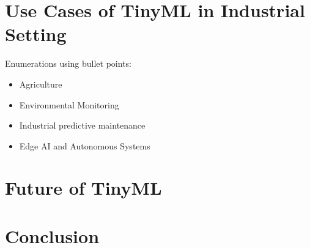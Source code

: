 \documentclass[twocolumn]{article}
\begin{document}
\section{Use Cases of TinyML in Industrial Setting}
\label{use_cases}

Enumerations using bullet points:

\begin{itemize}
	\item 	Agriculture
	\item 	Environmental Monitoring
	\item 	Industrial predictive maintenance
	\item 	Edge AI and Autonomous Systems
\end{itemize}


\section{Future of TinyML }
\label{future_of_tinyml}



\section{Conclusion}
\label{conclusion}



\nocite{hussein_original_2024,paul_rethinking_2021}




\end{document}

